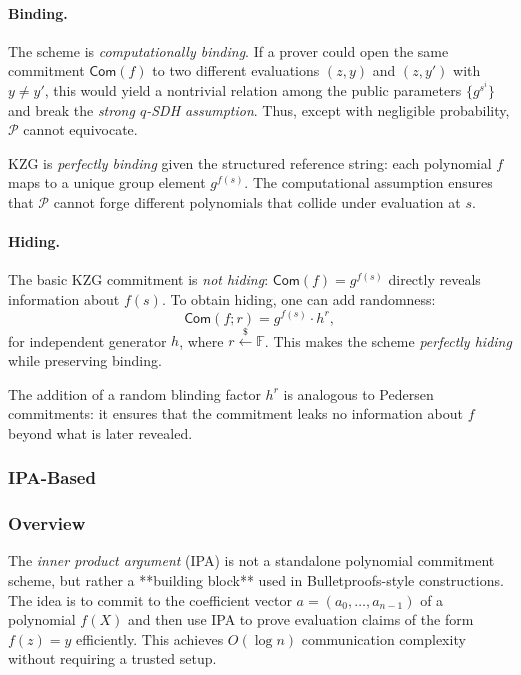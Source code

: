 \myspace

\paragraph{Binding.}

The scheme is \emph{computationally binding}.  
If a prover could open the same commitment $\mathsf{Com}(f)$ to two different evaluations $(z,y)$ and $(z,y')$ with $y\neq y'$, this would yield a nontrivial relation among the public parameters $\{g^{s^i}\}$ and break the \emph{strong $q$-SDH assumption}.  
Thus, except with negligible probability, $\mathcal{P}$ cannot equivocate.

\begin{remark}
KZG is \emph{perfectly binding} given the structured reference string: each polynomial $f$ maps to a unique group element $g^{f(s)}$.  
The computational assumption ensures that $\mathcal{P}$ cannot forge different polynomials that collide under evaluation at $s$.
\end{remark}

\myspace

\paragraph{Hiding.}

The basic KZG commitment is \emph{not hiding}: $\mathsf{Com}(f) = g^{f(s)}$ directly reveals information about $f(s)$.  
To obtain hiding, one can add randomness:
\[
\mathsf{Com}(f;r) = g^{f(s)} \cdot h^r,
\]
for independent generator $h$, where $r \xleftarrow{\$} \mathbb{F}$.  
This makes the scheme \emph{perfectly hiding} while preserving binding.

\begin{remark}
The addition of a random blinding factor $h^r$ is analogous to Pedersen commitments: it ensures that the commitment leaks no information about $f$ beyond what is later revealed.
\end{remark}


\subsubsection{IPA-Based}

\subsubsection*{Overview}

The \emph{inner product argument} (IPA) is not a standalone polynomial commitment scheme, but rather a **building block** used in Bulletproofs-style constructions.  
The idea is to commit to the coefficient vector $a = (a_0, \dots, a_{n-1})$ of a polynomial $f(X)$ and then use IPA to prove evaluation claims of the form $f(z) = y$ efficiently.  
This achieves $O(\log n)$ communication complexity without requiring a trusted setup.

